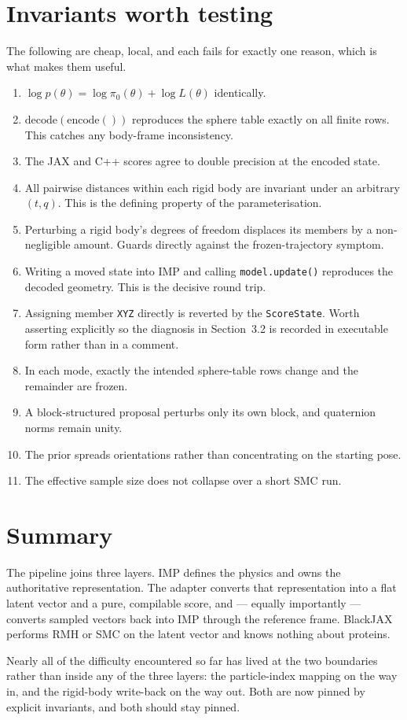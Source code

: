\documentclass[11pt]{article}
\newcommand{\code}[1]{\texttt{#1}}
\begin{document}
\section{Invariants worth testing}

The following are cheap, local, and each fails for exactly one reason, which is
what makes them useful.

\begin{enumerate}[leftmargin=1.8em]
  \item $\log p(\theta) = \log \pi_0(\theta) + \log L(\theta)$ identically.
  \item $\mathrm{decode}(\mathrm{encode}())$ reproduces the sphere table exactly
    on all finite rows. This catches any body-frame inconsistency.
  \item The JAX and C++ scores agree to double precision at the encoded state.
  \item All pairwise distances within each rigid body are invariant under an
    arbitrary $(t,q)$. This is the defining property of the parameterisation.
  \item Perturbing a rigid body's degrees of freedom displaces its members by a
    non-negligible amount. Guards directly against the frozen-trajectory
    symptom.
  \item Writing a moved state into IMP and calling \code{model.update()}
    reproduces the decoded geometry. This is the decisive round trip.
  \item Assigning member \code{XYZ} directly is reverted by the
    \code{ScoreState}. Worth asserting explicitly so the diagnosis in
    Section~3.2 is recorded in executable form rather than in a comment.
  \item In each mode, exactly the intended sphere-table rows change and the
    remainder are frozen.
  \item A block-structured proposal perturbs only its own block, and quaternion
    norms remain unity.
  \item The prior spreads orientations rather than concentrating on the starting
    pose.
  \item The effective sample size does not collapse over a short SMC run.
\end{enumerate}

\section{Summary}

The pipeline joins three layers. IMP defines the physics and owns the
authoritative representation. The adapter converts that representation into a
flat latent vector and a pure, compilable score, and --- equally importantly ---
converts sampled vectors back into IMP through the reference frame. BlackJAX
performs RMH or SMC on the latent vector and knows nothing about proteins.

Nearly all of the difficulty encountered so far has lived at the two boundaries
rather than inside any of the three layers: the particle-index mapping on the
way in, and the rigid-body write-back on the way out. Both are now pinned by
explicit invariants, and both should stay pinned.
\end{document}
